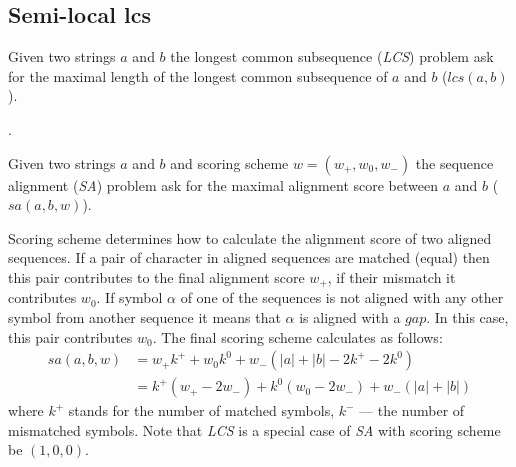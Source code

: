 \subsection{Semi-local lcs}

\begin{definition}
Given two strings $a$ and $b$  the longest common subsequence (\emph{LCS}) problem ask for the maximal length of the longest common subsequence of $a$ and $b$ ($lcs(a,b)$).
\end{definition} 
.

\begin{definition}
Given two strings $a$ and $b$ and scoring scheme $w=(w_{+},w_{0},w_{-})$ the sequence alignment (\emph{SA}) problem ask for the maximal alignment score between $a$ and $b$ ($sa(a,b,w)$).
\end{definition}

Scoring scheme determines how to calculate the alignment score of two aligned sequences.
If a pair of character in aligned sequences are matched (equal) then this pair contributes to the final alignment score $w_{+}$, if their mismatch it contributes $w_{0}$.
If symbol $\alpha$ of one of the sequences is not aligned with any other symbol from another sequence it means that $\alpha$ is aligned with a $gap$.
In this case, this pair contributes $w_{0}$.
The final scoring scheme calculates as follows:
\begin{equation}\label{formula:sa}
\begin{array}{ll}
    sa(a,b,w) &= w_{+}k^{+} + w_{0}k^{0} + w_{-} (|a| + |b| - 2k^{+} - 2k^{0}) \\
    &= k^{+} (w_{+} - 2w_{-} ) + k^{0}  (w_{0} - 2w_{-}) + w_{-}(|a| + |b|)
\end{array}
\end{equation}
where $k^{+}$ stands for the number of matched symbols, $k^{-}$ --- the number of mismatched symbols.
Note that \emph{LCS} is a special case of \emph{SA} with scoring scheme be $(1,0,0)$.

